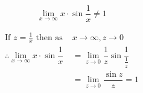 \documentclass[14pt,fleqn]{extarticle}
\begin{document}
 

\[ \lim_{x\to\infty} x\cdot\sin\dfrac{1}{x} \neq1 \]

\newcard 

\begin{align}
\text{If } z = \frac{1}{x}\text{ then as }&x\to\infty, z\to 0 \\
\therefore \lim_{x\to\infty} x\cdot\sin\dfrac{1}{x} &= \lim_{z\to 0}\dfrac{1}{z}\sin\dfrac{1}{\frac{1}{z}} \\
&=\lim_{z\to 0}\dfrac{\sin z}{z} = 1
\end{align}
\end{document}
